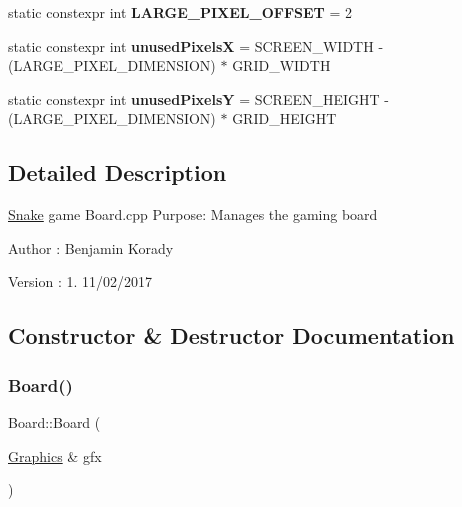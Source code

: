 \begin{DoxyCompactItemize}
\item 
\mbox{\label{class_board_ae9697a8aec0c7287651f758590e286c2}} 
static constexpr int {\bfseries L\+A\+R\+G\+E\+\_\+\+P\+I\+X\+E\+L\+\_\+\+O\+F\+F\+S\+ET} = 2
\item 
\mbox{\label{class_board_a40ede8b5ef707e33c5e5423376ba0680}} 
static constexpr int {\bfseries unused\+PixelsX} = S\+C\+R\+E\+E\+N\+\_\+\+W\+I\+D\+TH -\/ (L\+A\+R\+G\+E\+\_\+\+P\+I\+X\+E\+L\+\_\+\+D\+I\+M\+E\+N\+S\+I\+ON) $\ast$ G\+R\+I\+D\+\_\+\+W\+I\+D\+TH
\item 
\mbox{\label{class_board_a4e101f3a2d9dc6f1b001bb7764d58ff7}} 
static constexpr int {\bfseries unused\+PixelsY} = S\+C\+R\+E\+E\+N\+\_\+\+H\+E\+I\+G\+HT -\/ (L\+A\+R\+G\+E\+\_\+\+P\+I\+X\+E\+L\+\_\+\+D\+I\+M\+E\+N\+S\+I\+ON) $\ast$ G\+R\+I\+D\+\_\+\+H\+E\+I\+G\+HT
\end{DoxyCompactItemize}


\subsection{Detailed Description}
\hyperlink{class_snake}{Snake} game Board.\+cpp Purpose\+: Manages the gaming board

\begin{DoxyAuthor}{Author}
\+: Benjamin Korady 
\end{DoxyAuthor}
\begin{DoxyVersion}{Version}
\+: 1. 11/02/2017 
\end{DoxyVersion}


\subsection{Constructor \& Destructor Documentation}
\mbox{\label{class_board_a46374cb53089d5abbf7609234dca4828}} 
\subsubsection{\texorpdfstring{Board()}{Board()}}
{\footnotesize\ttfamily Board\+::\+Board (\begin{DoxyParamCaption}\item[{\hyperlink{class_graphics}{Graphics} \&}]{gfx }\end{DoxyParamCaption})}

